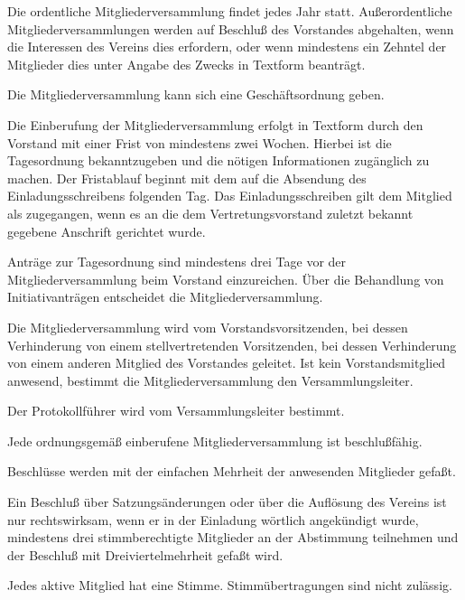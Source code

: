 \documentclass[draft]{scrartcl}
\begin{document}
\begin{contract}
Die ordentliche Mitgliederversammlung findet jedes Jahr statt.
Außerordentliche Mitgliederversammlungen werden auf Beschluß des Vorstandes
abgehalten, wenn die Interessen des Vereins dies erfordern, oder wenn
mindestens ein Zehntel der Mitglieder dies unter Angabe des Zwecks in Textform
beanträgt.

Die Mitgliederversammlung kann sich eine Geschäftsordnung geben.


Die Einberufung der Mitgliederversammlung erfolgt in Textform durch den
Vorstand mit einer Frist von mindestens zwei Wochen. Hierbei ist die
Tagesordnung bekanntzugeben und die nötigen Informationen zugänglich zu
machen. Der Fristablauf beginnt mit dem auf die Absendung des
Einladungsschreibens folgenden Tag. Das Einladungsschreiben gilt dem Mitglied
als zugegangen, wenn es an die dem Vertretungsvorstand zuletzt bekannt
gegebene Anschrift gerichtet wurde.

Anträge zur Tagesordnung sind mindestens drei Tage vor der
Mitgliederversammlung beim Vorstand einzureichen. Über die Behandlung von
Initiativanträgen entscheidet die Mitgliederversammlung.


Die Mitgliederversammlung wird vom Vorstandsvorsitzenden, bei dessen
Verhinderung von einem stellvertretenden Vorsitzenden, bei dessen Verhinderung
von einem anderen Mitglied des Vorstandes geleitet. Ist kein Vorstandsmitglied
anwesend, bestimmt die Mitgliederversammlung den Versammlungsleiter.

Der Protokollführer wird vom Versammlungsleiter bestimmt.


Jede ordnungsgemäß einberufene Mitgliederversammlung ist beschlußfähig.

Beschlüsse werden mit der einfachen Mehrheit der anwesenden Mitglieder gefaßt.

Ein Beschluß über Satzungsänderungen oder über die Auflösung des Vereins ist
nur rechtswirksam, wenn er in der Einladung wörtlich angekündigt wurde,
mindestens drei stimmberechtigte Mitglieder an der Abstimmung teilnehmen und
der Beschluß mit Dreiviertelmehrheit gefaßt wird.\label{MV-Aufloesung}


Jedes aktive Mitglied hat eine Stimme. Stimmübertragungen sind nicht
zulässig.\label{Stimmrechte}


\end{contract}
\end{document}
